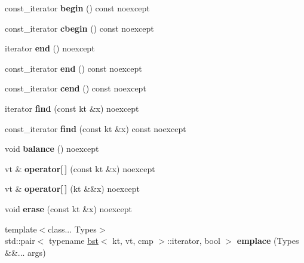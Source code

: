 \begin{DoxyCompactItemize}
\item 
\mbox{\label{classbst_a8631fb03856c2cd4602fc7446502195c}} 
const\+\_\+iterator {\bfseries begin} () const noexcept
\item 
\mbox{\label{classbst_a74e78aa7f879a5df0b933651174de42b}} 
const\+\_\+iterator {\bfseries cbegin} () const noexcept
\item 
\mbox{\label{classbst_aed3a831efc810b5084cb0c9f4adeb16a}} 
iterator {\bfseries end} () noexcept
\item 
\mbox{\label{classbst_aa9fa40cf0781035f180aa56d15f0e2d1}} 
const\+\_\+iterator {\bfseries end} () const noexcept
\item 
\mbox{\label{classbst_a2f78931b69f0a121823b60393f1b9745}} 
const\+\_\+iterator {\bfseries cend} () const noexcept
\item 
\mbox{\label{classbst_a6c2bdb4e40b2a6871840af57f42765f8}} 
iterator {\bfseries find} (const kt \&x) noexcept
\item 
\mbox{\label{classbst_a2971e3ad8b28cf5bdf08128eee48d26d}} 
const\+\_\+iterator {\bfseries find} (const kt \&x) const noexcept
\item 
\mbox{\label{classbst_a4ac74357616de45d5d3e7cbb9850854e}} 
void {\bfseries balance} () noexcept
\item 
\mbox{\label{classbst_ae9b1b8ff05ece0ac05e8dfca244e556e}} 
vt \& {\bfseries operator\mbox{[}$\,$\mbox{]}} (const kt \&x) noexcept
\item 
\mbox{\label{classbst_a024d828ac753881e50cd7cc93a47a3cc}} 
vt \& {\bfseries operator\mbox{[}$\,$\mbox{]}} (kt \&\&x) noexcept
\item 
\mbox{\label{classbst_af5ed588b2c686b3b53a2b5466a617f73}} 
void {\bfseries erase} (const kt \&x) noexcept
\item 
\mbox{\label{classbst_afcc3983e4d16eaa758aec0adb71759bb}} 
{\footnotesize template$<$class... Types$>$ }\\std\+::pair$<$ typename \hyperlink{classbst}{bst}$<$ kt, vt, cmp $>$\+::iterator, bool $>$ {\bfseries emplace} (Types \&\&... args)
\end{DoxyCompactItemize}
